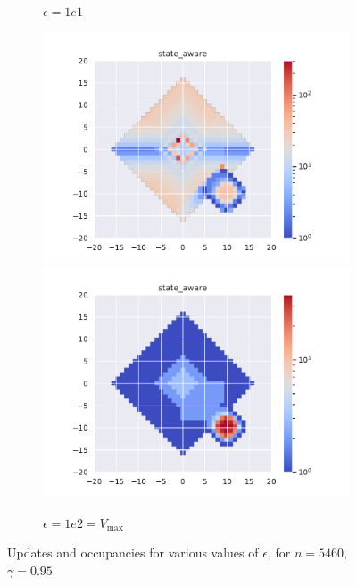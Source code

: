 \documentclass[runningheads]{llncs}
\begin{document}
\begin{figure}[H]
\begin{subfigure}[b]{\linewidth}
        \caption{$\epsilon=1e1$}
    \end{subfigure}
    \begin{subfigure}[b]{\linewidth}
        \centering
        \includegraphics[width=0.49\linewidth]{img/epsilon/1e2/updates_state_aware.pdf}
        \includegraphics[width=0.49\linewidth]{img/epsilon/1e2/occupations_state_aware.pdf}
        \caption{$\epsilon=1e2 = V_{\max}$}
    \end{subfigure}
    \caption{Updates and occupancies for various values of $\epsilon$, for $n = 5460$, $\gamma=0.95$}
\end{figure}
\end{document}
